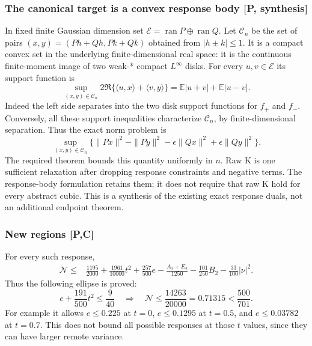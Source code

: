\subsubsection{The canonical target is a convex response body [P, synthesis]}
In fixed finite Gaussian dimension set $\mathcal E=\operatorname{ran}P
\oplus\operatorname{ran}Q$. Let $\mathcal C_n$ be the set of pairs
$(x,y)=(P h+Qh,Pk+Qk)$ obtained from $|h\pm k|\le1$.
It is a compact convex set in the underlying finite-dimensional real
space: it is the continuous finite-moment image of two weak-* compact
$L^\infty$ disks. For every $u,v\in\mathcal E$ its support function is
\[
 \sup_{(x,y)\in\mathcal C_n}2\Re\{\langle u,x\rangle+\langle v,y\rangle\}
       =\mathbb E|u+v|+\mathbb E|u-v|.
\]
Indeed the left side separates into the two disk support functions for
$f_+$ and $f_-$. Conversely, all these support inequalities characterize
$\mathcal C_n$, by finite-dimensional separation. Thus the exact norm
problem is
\[
 \sup_{(x,y)\in\mathcal C_n}
 \{\|Px\|^2-\|Py\|^2-\epsilon\|Qx\|^2+\epsilon\|Qy\|^2\}.
\]
The required theorem bounds this quantity uniformly in $n$. Raw K is one
sufficient relaxation after dropping response constraints and negative
terms. The response-body formulation retains them; it does not require
that raw K hold for every abstract cubic. This is a synthesis of the
existing exact response duals, not an additional endpoint theorem.

\subsubsection{New regions [P,C]}
For every such response,
\begin{equation}\label{eq:cre-global-quadratic}
\boxed{\begin{aligned}
 \mathcal N\le{}&\frac{1195}{2000}+\frac{1961}{10000}t^2
       +\frac{257}{500}e
       -\frac{A_2+E_2}{1250}-\frac{101}{250}B_2
       -\frac{33}{100}|\nu|^2.
\end{aligned}}
\end{equation}
Thus the following ellipse is proved:
\begin{equation}\label{eq:cre-ellipse}
 \boxed{\quad e+\frac{191}{500}t^2\le\frac9{40}
 \quad\Longrightarrow\quad
 \mathcal N\le\frac{14263}{20000}=0.71315<\frac{500}{701}.\quad}
\end{equation}
For example it allows $e\le0.225$ at $t=0$, $e\le0.1295$ at $t=0.5$,
and $e\le0.03782$ at $t=0.7$. This does not bound all possible responses
at those $t$ values, since they can have larger remote variance.

